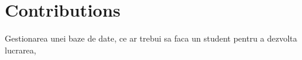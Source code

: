 \chapter*{Contributions}
Gestionarea unei baze de date, ce ar trebui sa faca un student pentru a dezvolta lucrarea, 
\newpage